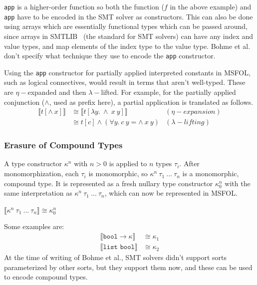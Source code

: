 \documentclass{article}
\begin{document}
	\texttt{app} is a higher-order 
	function so both the function 
	($f$ in the above example) and 
	\texttt{app} have to be encoded 
	in the SMT solver as constructors.
	This can also be done using arrays 
	which are essentially functional 
	types which can be passed
	around, since arrays in 
	SMTLIB~\cite{BarFT-SMTLIB} (the 
	standard for SMT solvers)
	can have any index and value types, 
	and map elements of the index type 
	to the value type. Bohme et al. 
	don't specify what technique 
	they use to encode the 
	\texttt{app} constructor.
	
	Using the \texttt{app} constructor
	for partially applied interpreted 
	constants in MSFOL, such as 
	logical connectives, would result 
	in terms that aren't well-typed.
	These are $\eta-$expanded and 
	then $\lambda-$lifted. For example, 
	for the partially applied 
	conjunction ($\land$, used as prefix 
	here), a partial application is 
	translated as follows.
	\begin{align*}
	\llbracket t [\land\ x] 
	\rrbracket &\cong \llbracket 
	t[\lambda y.\ \land\ x\ y]
	\rrbracket&(\eta-expansion)\\
	&\cong t[c]  \land (\forall y.\ 
	c\ y = \land\ x\ y) &(\lambda-lifting)
	\end{align*}
	
	\subsubsection{Erasure of Compound Types}
	A type constructor $\kappa^n$ with 
	$n > 0$ is applied to $n$ types 
	$\tau_i$. After monomorphization, 
	each $\tau_i$ is monomorphic, so 
	$\kappa^n\ \tau_1\ ...\ \tau_n$ 
	is a monomorphic, compound type. It
	is represented as a fresh nullary 
	type constructor $\kappa_0^n$ with 
	the same interpretation as 
	$\kappa^n\ \tau_1\ ...\ \tau_n$, 
	which can now be represented in 
	MSFOL.
	\begin{center}
		$\llbracket \kappa^n\ 
		\tau_1\ ...\ \tau_n \rrbracket
		\cong \kappa_0^n$
	\end{center}
	Some examples are:
	\begin{align*}
	\llbracket \texttt{bool} \to
	\kappa \rrbracket &\cong \kappa_1\\
	\llbracket \texttt{list\ bool}
	\rrbracket &\cong \kappa_2
	\end{align*}
	At the time of writing of Bohme et al.,
	SMT solvers didn't support sorts 
	parameterized by other sorts, but they 
	support them now, and these can be 
	used to encode compound types.
	
\end{document}

